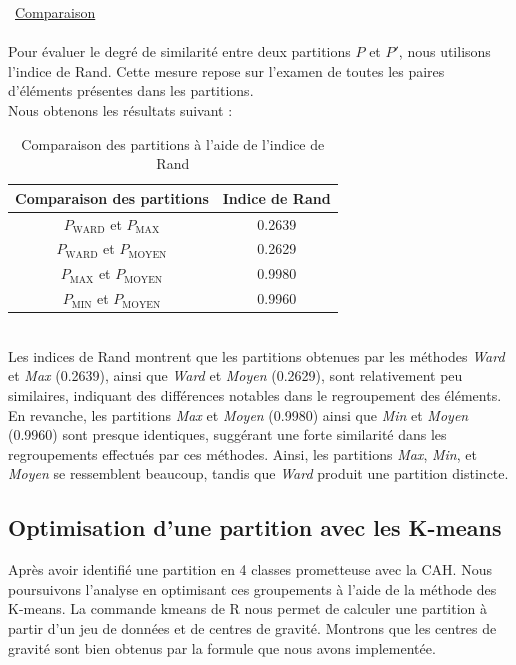 \documentclass{article}
\begin{document}
\textbullet\ \underline{Comparaison}
\\\\
Pour évaluer le degré de similarité entre deux partitions \( P \) et \( P' \), nous utilisons l'indice de Rand. Cette mesure repose sur l'examen de toutes les paires d'éléments présentes dans les partitions.
\\
Nous obtenons les résultats suivant :
\begin{table}[ht]
    \centering
    \begin{tabular}{|c|c|}
    \hline
    \textbf{Comparaison des partitions} & \textbf{Indice de Rand} \\
    \hline
    \( P_{\text{WARD}} \) et \( P_{\text{MAX}} \) & 0.2639 \\
    \( P_{\text{WARD}} \) et \( P_{\text{MOYEN}} \) & 0.2629 \\
    \( P_{\text{MAX}} \) et \( P_{\text{MOYEN}} \) & 0.9980 \\
    \( P_{\text{MIN}} \) et \( P_{\text{MOYEN}} \) & 0.9960 \\
    \hline
    \end{tabular}
    \caption{Comparaison des partitions à l'aide de l'indice de Rand}
    \end{table}
\\
Les indices de Rand montrent que les partitions obtenues par les méthodes \textit{Ward} et \textit{Max} (0.2639), ainsi que \textit{Ward} et \textit{Moyen} (0.2629), sont relativement peu similaires, indiquant des différences notables dans le regroupement des éléments. En revanche, les partitions \textit{Max} et \textit{Moyen} (0.9980) ainsi que \textit{Min} et \textit{Moyen} (0.9960) sont presque identiques, suggérant une forte similarité dans les regroupements effectués par ces méthodes. Ainsi, les partitions \textit{Max}, \textit{Min}, et \textit{Moyen} se ressemblent beaucoup, tandis que \textit{Ward} produit une partition distincte.



\subsection{Optimisation d'une partition avec les K-means}
Après avoir identifié une partition en 4 classes prometteuse avec la CAH. Nous poursuivons l'analyse en optimisant ces groupements à l'aide de la méthode des K-means. 
La commande kmeans de R nous permet de calculer une partition à partir d'un jeu de 
données et de centres de gravité. Montrons que les centres de gravité sont bien obtenus par la formule que nous avons implementée.
\end{document}
